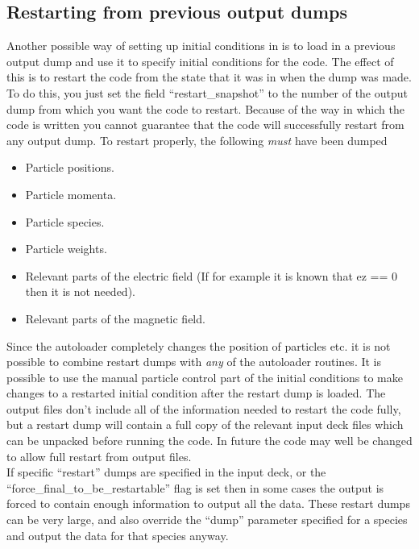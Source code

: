 \subsection{Restarting {\EPOCH} from previous output dumps}
Another possible way of setting up initial conditions in {\EPOCH} is to load in
a previous output dump and use it to specify initial conditions for the
code. The effect of this is to restart the code from the state that it was in
when the dump was made. To do this, you just
set the field ``restart\_snapshot'' to
the number of the output dump from which you want the code to restart. Because
of the way in which the code is written you cannot guarantee that the code will
successfully restart from any output dump. To restart properly, the
following {\it must} have been dumped
\begin{itemize}
\item Particle positions.
\item Particle momenta.
\item Particle species.
\item Particle weights.
\item Relevant parts of the electric field (If for example it is known that
  ez == 0 then it is not needed).
\item Relevant parts of the magnetic field.
\end{itemize}
Since the autoloader completely changes the position of particles etc. it is
not possible to combine restart dumps with {\it any} of the autoloader
routines. It is possible to use the manual particle control part of the
initial conditions to make changes to a restarted initial condition after the
restart dump is loaded. The output files don't include all of the information
needed to restart the code fully, but a restart dump will contain a full copy
of the relevant input deck files which can be unpacked before running the
code. In future the code may well be changed to allow full restart from
output files.\\

If specific ``restart'' dumps are specified in the input deck, or the
``force\_final\_to\_be\_restartable'' flag is set then in some cases the
output is forced to contain enough information to output all the data. These
restart dumps can be very large, and also override the ``dump'' parameter
specified for a species and output the data for that species anyway.

\newpage

